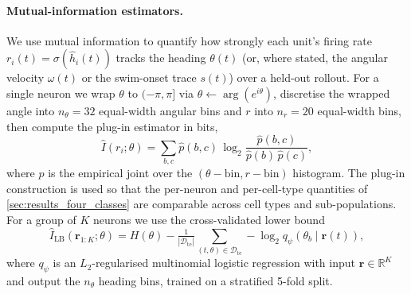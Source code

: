 \documentclass[11pt]{article}
\begin{document}
\paragraph{Mutual-information estimators.}\label{method:MI}
We use mutual information to quantify how strongly each unit's
firing rate $r_i(t) = \sigma(\hat h_i(t))$ tracks the heading
$\theta(t)$ (or, where stated, the angular velocity $\omega(t)$ or
the swim-onset trace $s(t)$) over a held-out rollout. For a single
neuron we wrap $\theta$ to $(-\pi, \pi]$ via
$\theta \leftarrow \arg(e^{i\theta})$, discretise the wrapped angle
into $n_\theta = 32$ equal-width angular bins and $r$ into $n_r = 20$
equal-width bins, then compute the plug-in estimator in bits,
\begin{equation}
\hat I(r_i;\theta) = \sum_{b,c} \hat p(b,c)\,\log_2
\frac{\hat p(b,c)}{\hat p(b)\,\hat p(c)},
\label{eq:zhd_mi_plugin}
\end{equation}
where $\hat p$ is the empirical joint over the
$(\theta\!\!-\!\!\mathrm{bin}, r\!\!-\!\!\mathrm{bin})$ histogram. The
plug-in construction is used so that the per-neuron and
per-cell-type quantities of
\cref{sec:results_four_classes} are
comparable across cell types and sub-populations. For a group of $K$ neurons we
use the cross-validated lower bound
\begin{equation}
\hat I_{\mathrm{LB}}(\mathbf r_{1:K};\theta) =
H(\theta) - \tfrac{1}{|\mathcal D_{\mathrm{te}}|}
\sum_{(t,\theta)\in\mathcal D_{\mathrm{te}}}
-\log_2 q_\psi(\theta_b\mid \mathbf r(t)),
\label{eq:zhd_mi_joint_lb}
\end{equation}
where $q_\psi$ is an $L_2$-regularised multinomial logistic
regression with input $\mathbf r \in \mathbb R^K$ and output the
$n_\theta$ heading bins, trained on a stratified 5-fold split.

\iffalse  %
\end{document}
